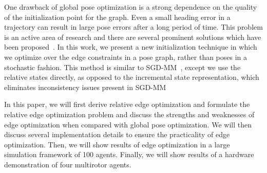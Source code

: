 One drawback of global pose optimization is a strong dependence on the quality of the initialization point for the graph.  Even a small heading error in a trajectory can result in large pose errors after a long period of time.  This problem is an active area of research and there are several prominent solutions which have been proposed~\cite{Carlone2015, Kim2010a, Agarwal2014, Wang2014}.  In this work, we present a new initialization technique in which we optimize over the edge constraints in a pose graph, rather than poses in a stochastic fashion. This method is similar to SGD-MM~\cite{Wang2014}, except we use the relative states directly, as opposed to the incremental state representation, which eliminates inconsistency issues present in SGD-MM~\cite{PAPER}

In this paper, we will first derive relative edge optimization and formulate the relative edge optimization problem and discuss the strengths and weaknesses of edge optimization when compared with global pose optimization.  We will then discuss several implementation details to ensure the practicality of edge optimization. Then, we will show results of edge optimization in a large simulation framework of 100 agents.  Finally, we will show results of a hardware demonstration of four multirotor agents.
